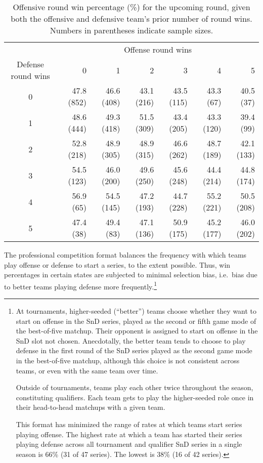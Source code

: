 \documentclass{article}
\begin{document}
\begin{table}

\caption{Offensive round win percentage (\%) for the upcoming round, given both the offensive and defensive team's prior number of round wins. Numbers in parentheses indicate sample sizes.}

\centering
\begin{tabular}{crrrrrr}
\toprule
& \multicolumn{6}{c}{Offense round wins} \\ 
\cmidrule(lr){2-7}
Defense round wins & 0 & 1 & 2 & 3 & 4 & 5 \\ 
\midrule

0 & 47.8 (852) & 46.6 (408) & 43.1 (216) & 43.5 (115) & 43.3 (67)  & 40.5 (37)  \\
1 & 48.6 (444) & 49.3 (418) & 51.5 (309) & 43.4 (205) & 43.3 (120) & 39.4 (99)  \\
2 & 52.8 (218) & 48.9 (305) & 48.9 (315) & 46.6 (262) & 48.7 (189) & 42.1 (133) \\
3 & 54.5 (123) & 46.0 (200) & 49.6 (250) & 45.6 (248) & 44.4 (214) & 44.8 (174) \\
4 & 56.9 (65)  & 54.5 (145) & 47.2 (193) & 44.7 (228) & 55.2 (221) & 50.5 (208) \\
5 & 47.4 (38)  & 49.4 (83)  & 47.1 (136) & 50.9 (175) & 45.2 (177) & 46.0 (202) \\

\bottomrule
\end{tabular}

\label{tbl:o-win-prop-by-series-state}

\end{table}

The professional competition format balances the frequency with which
teams play offense or defense to start a series, to the extent possible.
Thus, win percentages in certain states are subjected to minimal
selection bias, i.e.~bias due to better teams playing defense more
frequently.\footnote{At tournaments, higher-seeded (``better'') teams
  choose whether they want to start on offense in the SnD series, played
  as the second or fifth game mode of the best-of-five matchup. Their
  opponent is assigned to start on offense in the SnD slot not chosen.
  Anecdotally, the better team tends to choose to play defense in the
  first round of the SnD series played as the second game mode in the
  best-of-five matchup, although this choice is not consistent across
  teams, or even with the same team over time.

  Outside of tournaments, teams play each other twice throughout the
  season, constituting qualifiers. Each team gets to play the
  higher-seeded role once in their head-to-head matchups with a given
  team.

  This format has minimized the range of rates at which teams start
  series playing offense. The highest rate at which a team has started
  their series playing defense across all tournament and qualifier SnD
  series in a single season is 66\% (31 of 47 series). The lowest is
  38\% (16 of 42 series).}
\end{document}
